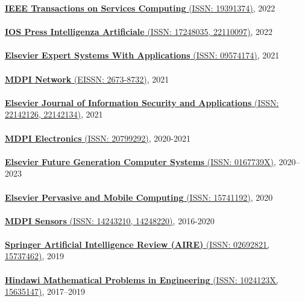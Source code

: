 \href{https://www.computer.org/csdl/journal/sc}{\textbf{IEEE Transactions on Services Computing} (ISSN: 19391374)}, 2022
\\ \halfblankline \\
\href{https://www.iospress.com/catalog/journals/intelligenza-artificiale}{\textbf{IOS Press Intelligenza Artificiale} (ISSN: 17248035, 22110097)}, 2022
\\ \halfblankline \\
\href{https://www.journals.elsevier.com/expert-systems-with-applications}{\textbf{Elsevier Expert Systems With Applications} (ISSN: 09574174)}, 2021
\\ \halfblankline \\
\href{https://www.mdpi.com/journal/network}{\textbf{MDPI Network} (EISSN: 2673-8732)}, 2021
\\ \halfblankline \\
\href{https://www.journals.elsevier.com/journal-of-information-security-and-applications}{\textbf{Elsevier Journal of Information Security and Applications} (ISSN: 22142126, 22142134)}, 2021
\\ \halfblankline \\
\href{https://www.mdpi.com/journal/electronics}{\textbf{MDPI Electronics} (ISSN: 20799292)}, 2020-2021
\\ \halfblankline \\
\href{https://www.sciencedirect.com/journal/future-generation-computer-systems}{\textbf{Elsevier Future Generation Computer Systems} (ISSN: 0167739X)}, 2020--2023
\\ \halfblankline \\
\href{https://www.journals.elsevier.com/pervasive-and-mobile-computing}{\textbf{Elsevier Pervasive and Mobile Computing} (ISSN: 15741192)}, 2020
\\ \halfblankline \\
\href{http://www.mdpi.com/journal/sensors}{\textbf{MDPI Sensors} (ISSN: 14243210, 14248220)}, 2016-2020
\\ \halfblankline \\
\href{https://link.springer.com/journal/10462}{\textbf{Springer Artificial Intelligence Review (AIRE)} (ISSN: 02692821, 15737462)}, 2019
\\ \halfblankline \\
\href{https://www.hindawi.com/journals/mpe/}{\textbf{Hindawi Mathematical Problems in Engineering} (ISSN: 1024123X, 15635147)}, 2017--2019
\\ \halfblankline \\
